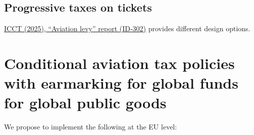 \subsection{Progressive taxes on tickets}

 \href{https://theicct.org/wp-content/uploads/2025/03/ID-302-%E2%80%93-Aviation-levy_report_final-v2.pdf}{ICCT (2025), ``Aviation levy'' report (ID-302)} provides different design options. %

\section{Conditional aviation tax policies with earmarking for global funds for global public goods}

We propose to implement the following at the EU level:

